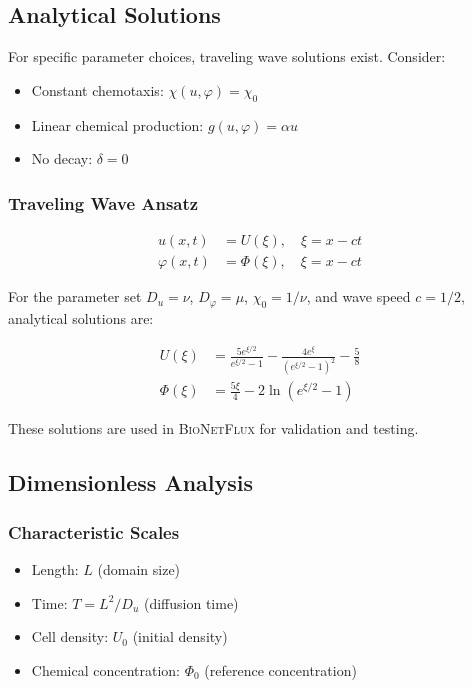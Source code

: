 \documentclass[11pt,a4paper]{article}
\newcommand{\bionetflux}{\textsc{BioNetFlux}}
\begin{document}
\subsection{Analytical Solutions}

For specific parameter choices, traveling wave solutions exist. Consider:
\begin{itemize}
    \item Constant chemotaxis: $\chi(u,\varphi) = \chi_0$
    \item Linear chemical production: $g(u,\varphi) = \alpha u$
    \item No decay: $\delta = 0$
\end{itemize}

\subsubsection{Traveling Wave Ansatz}
\begin{align}
u(x,t) &= U(\xi), \quad \xi = x - ct\\
\varphi(x,t) &= \Phi(\xi), \quad \xi = x - ct
\end{align}

For the parameter set $D_u = \nu$, $D_\varphi = \mu$, $\chi_0 = 1/\nu$, and wave speed $c = 1/2$, analytical solutions are:

\begin{align}
U(\xi) &= \frac{5e^{\xi/2}}{e^{\xi/2} - 1} - \frac{4e^\xi}{(e^{\xi/2} - 1)^2} - \frac{5}{8}\\
\Phi(\xi) &= \frac{5\xi}{4} - 2\ln(e^{\xi/2} - 1)
\end{align}

These solutions are used in \bionetflux{} for validation and testing.

\subsection{Dimensionless Analysis}

\subsubsection{Characteristic Scales}
\begin{itemize}
    \item Length: $L$ (domain size)
    \item Time: $T = L^2/D_u$ (diffusion time)
    \item Cell density: $U_0$ (initial density)
    \item Chemical concentration: $\Phi_0$ (reference concentration)
\end{itemize}
\end{document}

